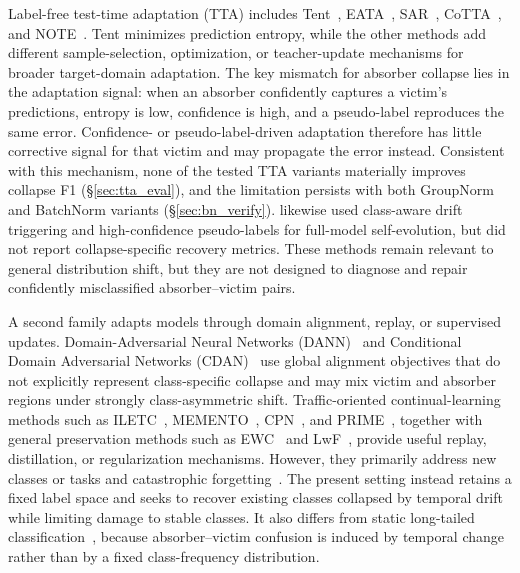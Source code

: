 \documentclass[preprint,12pt,authoryear]{elsarticle}
\let\cite\citep
\begin{document}
Label-free test-time adaptation (TTA) includes Tent~\cite{wang2021tent}, EATA~\cite{niu2022eata}, SAR~\cite{niu2023sar}, CoTTA~\cite{wang2022cotta}, and NOTE~\cite{gong2022note}. Tent minimizes prediction entropy, while the other methods add different sample-selection, optimization, or teacher-update mechanisms for broader target-domain adaptation. The key mismatch for absorber collapse lies in the adaptation signal: when an absorber confidently captures a victim's predictions, entropy is low, confidence is high, and a pseudo-label reproduces the same error. Confidence- or pseudo-label-driven adaptation therefore has little corrective signal for that victim and may propagate the error instead. Consistent with this mechanism, none of the tested TTA variants materially improves collapse F1 (\S\ref{sec:tta_eval}), and the limitation persists with both GroupNorm and BatchNorm variants (\S\ref{sec:bn_verify}). \citet{chen2025selfevolving} likewise used class-aware drift triggering and high-confidence pseudo-labels for full-model self-evolution, but did not report collapse-specific recovery metrics. These methods remain relevant to general distribution shift, but they are not designed to diagnose and repair confidently misclassified absorber--victim pairs.

A second family adapts models through domain alignment, replay, or supervised updates. Domain-Adversarial Neural Networks (DANN)~\cite{ganin2016dann} and Conditional Domain Adversarial Networks (CDAN)~\cite{long2018cdan} use global alignment objectives that do not explicitly represent class-specific collapse and may mix victim and absorber regions under strongly class-asymmetric shift. Traffic-oriented continual-learning methods such as ILETC~\cite{zhu2023iletc}, MEMENTO~\cite{cerasuolo2024memento}, CPN~\cite{cai2024cpn}, and PRIME~\cite{prime2025}, together with general preservation methods such as EWC~\cite{kirkpatrick2017ewc} and LwF~\cite{li2018lwf}, provide useful replay, distillation, or regularization mechanisms. However, they primarily address new classes or tasks and catastrophic forgetting~\cite{delange2022continual}. The present setting instead retains a fixed label space and seeks to recover existing classes collapsed by temporal drift while limiting damage to stable classes. It also differs from static long-tailed classification~\cite{kang2020decoupling,menon2021longtail}, because absorber--victim confusion is induced by temporal change rather than by a fixed class-frequency distribution.
\end{document}
